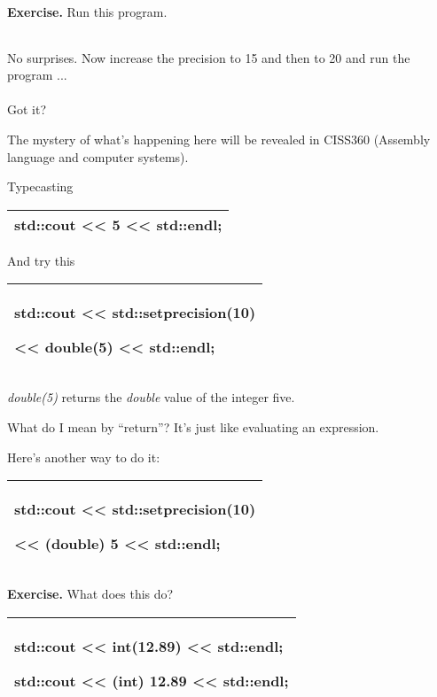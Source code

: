 \documentclass[
]{article}
\begin{document}
\textbf{Exercise.} Run this program.

\begin{longtable}[]{@{}@{}}
\toprule
\endhead
\bottomrule
\end{longtable}

No surprises. Now increase the precision to 15 and then to 20 and run
the program ...\\
~\\
Got it?

The mystery of what's happening here will be revealed in CISS360
(Assembly language and computer systems).

Typecasting

\begin{longtable}[]{@{}l@{}}
\toprule
\endhead
std::cout \textless\textless{} 5 \textless\textless{}
std::endl;\tabularnewline
\bottomrule
\end{longtable}

And try this

\begin{longtable}[]{@{}l@{}}
\toprule
\endhead
\begin{minipage}[t]{0.97\columnwidth}\raggedright
std::cout \textless\textless{} std::setprecision(10)

\textless\textless{} \textbf{double(5)} \textless\textless{}
std::endl;\strut
\end{minipage}\tabularnewline
\bottomrule
\end{longtable}

\emph{double(5)} returns the \emph{double} value of the integer five.

What do I mean by ``return''? It's just like evaluating an expression.

Here's another way to do it:

\begin{longtable}[]{@{}l@{}}
\toprule
\endhead
\begin{minipage}[t]{0.97\columnwidth}\raggedright
std::cout \textless\textless{} std::setprecision(10)

\textless\textless{} \textbf{(double) 5} \textless\textless{}
std::endl;\strut
\end{minipage}\tabularnewline
\bottomrule
\end{longtable}

\textbf{Exercise.} What does this do?

\begin{longtable}[]{@{}l@{}}
\toprule
\endhead
\begin{minipage}[t]{0.97\columnwidth}\raggedright
std::cout \textless\textless{} \textbf{int(12.89)} \textless\textless{}
std::endl;

std::cout \textless\textless{} \textbf{(int) 12.89} \textless\textless{}
std::endl;\strut
\end{minipage}\tabularnewline
\bottomrule
\end{longtable}
\end{document}
